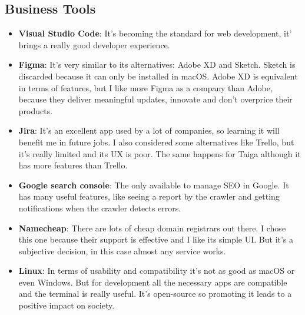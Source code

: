 \subsection*{Business Tools}
\begin{itemize}
    \item \textbf{Visual Studio Code}: It's becoming the standard for web development, it' brings a really good developer experience.
    \item \textbf{Figma}: It's very similar to its alternatives: Adobe XD and Sketch. Sketch is discarded because it can only be installed in macOS. Adobe XD is equivalent in terms of features, but I like more Figma as a company than Adobe, because they deliver meaningful updates, innovate and don't overprice their products. 
    \item \textbf{Jira}: It's an excellent app used by a lot of companies, so learning it will benefit me in future jobs. I also considered some alternatives like Trello, but it's really limited and its UX is poor. The same happens for Taiga although it has more features than Trello.
    \item \textbf{Google search console}: The only available to manage SEO in Google. It has many useful features, like seeing a report by the crawler and getting notifications when the crawler detects errors.
    \item \textbf{Namecheap}: There are lots of cheap domain registrars out there. I chose this one because their support is effective and I like its simple UI. But it's a subjective decision, in this case almost any service works.
    \item \textbf{Linux}: In terms of usability and compatibility it's not as good as macOS or even Windows. But for development all the necessary apps are compatible and the terminal is really useful. It's open-source so promoting it leads to a positive impact on society.
\end{itemize}

